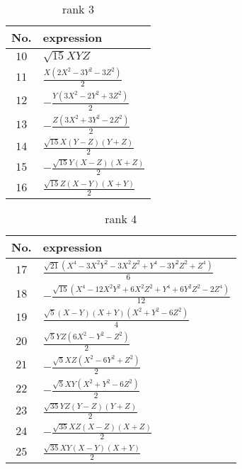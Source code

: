 \documentclass[fleqn,8pt,landscape]{jsarticle}
\begin{document}
\begin{table}[ht!]
\begin{center}
\caption{rank 3}
\renewcommand{\arraystretch}{1.3}
\begin{tabular}{cl} \hline \hline
No. & expression \\ \hline
$ 10 $ & $ \sqrt{15} X Y Z $ \\
$ 11 $ & $ \frac{X \left(2 X^{2} - 3 Y^{2} - 3 Z^{2}\right)}{2} $ \\
$ 12 $ & $ - \frac{Y \left(3 X^{2} - 2 Y^{2} + 3 Z^{2}\right)}{2} $ \\
$ 13 $ & $ - \frac{Z \left(3 X^{2} + 3 Y^{2} - 2 Z^{2}\right)}{2} $ \\
$ 14 $ & $ \frac{\sqrt{15} X \left(Y - Z\right) \left(Y + Z\right)}{2} $ \\
$ 15 $ & $ - \frac{\sqrt{15} Y \left(X - Z\right) \left(X + Z\right)}{2} $ \\
$ 16 $ & $ \frac{\sqrt{15} Z \left(X - Y\right) \left(X + Y\right)}{2} $ \\
 \hline \hline
\end{tabular}
\end{center}
\end{table}
\begin{table}[ht!]
\begin{center}
\caption{rank 4}
\renewcommand{\arraystretch}{1.3}
\begin{tabular}{cl} \hline \hline
No. & expression \\ \hline
$ 17 $ & $ \frac{\sqrt{21} \left(X^{4} - 3 X^{2} Y^{2} - 3 X^{2} Z^{2} + Y^{4} - 3 Y^{2} Z^{2} + Z^{4}\right)}{6} $ \\
$ 18 $ & $ - \frac{\sqrt{15} \left(X^{4} - 12 X^{2} Y^{2} + 6 X^{2} Z^{2} + Y^{4} + 6 Y^{2} Z^{2} - 2 Z^{4}\right)}{12} $ \\
$ 19 $ & $ \frac{\sqrt{5} \left(X - Y\right) \left(X + Y\right) \left(X^{2} + Y^{2} - 6 Z^{2}\right)}{4} $ \\
$ 20 $ & $ \frac{\sqrt{5} Y Z \left(6 X^{2} - Y^{2} - Z^{2}\right)}{2} $ \\
$ 21 $ & $ - \frac{\sqrt{5} X Z \left(X^{2} - 6 Y^{2} + Z^{2}\right)}{2} $ \\
$ 22 $ & $ - \frac{\sqrt{5} X Y \left(X^{2} + Y^{2} - 6 Z^{2}\right)}{2} $ \\
$ 23 $ & $ \frac{\sqrt{35} Y Z \left(Y - Z\right) \left(Y + Z\right)}{2} $ \\
$ 24 $ & $ - \frac{\sqrt{35} X Z \left(X - Z\right) \left(X + Z\right)}{2} $ \\
$ 25 $ & $ \frac{\sqrt{35} X Y \left(X - Y\right) \left(X + Y\right)}{2} $ \\
 \hline \hline
\end{tabular}
\end{center}
\end{table}
\end{document}
